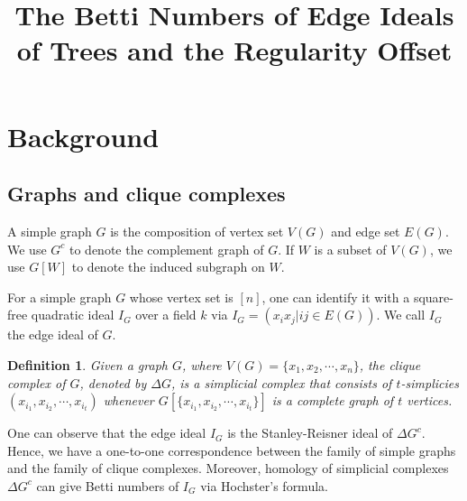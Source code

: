 \documentclass[dvipsnames,10pt]{article}
\title{\Large \textbf{The Betti Numbers of Edge Ideals of Trees and the Regularity Offset}}
\date{}
\newtheorem{defi}[theorem]{Definition}
\begin{document}
\maketitle

\section{Background}
\subsection{Graphs and clique complexes}
A simple graph $G$ is the composition of vertex set $V(G)$ and edge set $E(G)$. We use $G^c$ to denote the complement graph of $G$. If $W$ is a subset of $V(G)$, we use $G[W]$ to denote the induced subgraph on $W$.

For a simple graph $G$ whose vertex set is $[n]$, one can identify it with
a square-free quadratic ideal $I_G$ over a field $k$ via $I_G=(x_ix_j | ij\in E(G))$. We call $I_G$ the edge ideal of $G$.

\begin{defi}
    Given a graph $G$, where $V(G)=\{x_1,x_2,\cdots,x_n\}$, the clique complex of $G$, denoted by $\Delta G$, is a simplicial complex that consists of $t$-simplicies $(x_{i_1},x_{i_2},\cdots ,x_{i_t})$ whenever $G[\{x_{i_1},x_{i_2},\cdots ,x_{i_t}\}]$ is a complete graph of $t$ vertices.
\end{defi}

One can observe that the edge ideal $I_G$ is the Stanley-Reisner ideal of $\Delta G^c$. Hence, we have a one-to-one correspondence between the family of simple graphs and the family of clique complexes. Moreover, homology of simplicial complexes $\Delta G^c$ can give Betti numbers of $I_G$ via Hochster's formula.
\end{document}
